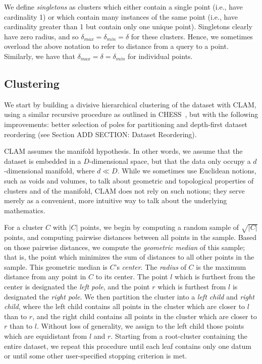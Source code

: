We define \emph{singletons} as clusters which either contain a single point (i.e., have cardinality 1) or which contain 
many instances of the same point (i.e., have cardinality greater than 1 but contain only one unique point). Singletons clearly 
have zero radius, and so $\delta_{max} = \delta_{min} = \delta$ for these clusters. Hence, we sometimes overload the above 
notation to refer to distance from a query to a point. Similarly, we have that $\delta_{max} = \delta = \delta_{min}$ for 
individual points.


\subsection{Clustering}
\label{subsec:methods:clustering}

We start by building a divisive hierarchical clustering of the dataset with CLAM, using a 
similar recursive procedure as outlined in CHESS~\cite{ishaq2019clustered}, but with the following 
improvements: better selection of poles for partitioning and depth-first dataset reordering 
(see Section ADD SECTION: Dataset Reordering). 


CLAM assumes the manifold hypothesis. 
In other words, we assume that the dataset is embedded in a $D$-dimensional space, but that the data only occupy 
a $d$-dimensional manifold, where $d \ll D$. 
While we sometimes use Euclidean notions, such as voids and volumes, to talk about geometric and topological 
properties of clusters and of the manifold, CLAM does not rely on such notions; 
they serve merely as a convenient, more intuitive way to talk about the underlying mathematics.


For a cluster $C$ with $|C|$ points, we begin by computing a 
random sample of $\sqrt{|C|}$ points, and computing pairwise distances 
between all points in the sample. Based on those pairwise distances, we compute the \emph{geometric median} of this sample; 
that is, the point which minimizes the sum of distances to all other points in the sample. This geometric median 
is $C$'s \emph{center}. The \emph{radius} of $C$ is the maximum distance from any point in $C$ to its center.
The point $l$ which is furthest from the center is designated the \emph{left pole}, and the point $r$ which is furthest
from $l$ is designated the \emph{right pole}. We then partition the cluster into a \emph{left child} and \emph{right child}, where the 
left child contains all points in the cluster which are closer to $l$ than to $r$, and the right child contains all 
points in the cluster which are closer to $r$ than to $l$. Without loss of generality, we assign to the left child 
those points which are equidistant from $l$ and $r$. Starting from a root-cluster containing the entire dataset, we 
repeat this procedure until each leaf contains only one datum or until some other user-specified stopping criterion 
is met.


